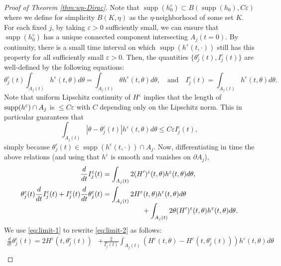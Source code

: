 \documentclass[10pt]{amsart}
\theoremstyle{plain}
\theoremstyle{definition}
\DeclareMathOperator{\supp}{supp}
\let\tht\theta
\let\varep\varepsilon
\begin{document}
\begin{proof}[Proof of Theorem \ref{thm:wp-Dirac}]
Note that $\supp(h_0^{\varep}) \subset B(\supp(h_0), C\varep)$ where we define for simplicity $B(K,\eta)$ as the $\eta$-neighborhood of some set $K$. For each fixed $j$, by taking $\varep>0$ sufficiently small, we can ensure that $\supp(h_0^{\varep})$ has a unique connected component intersecting $A_{j}(t=0)$. By continuity, there is a small time interval on which $\supp(h^\varep(t,\cdot))$ still has this property for all sufficiently small $\varep>0$. Then, the quantities $\{ \tht_{j}^\varep(t), I_{j}^{\varep}(t) \}$ are well-defined by the following equations:\vspace*{-3pt}
\begin{equation*}
\tht_{j}^{\varep}(t) \int_{A_{j}(t)} h^\varep(t,\tht) d\tht = \int_{A_{j}(t)} \tht h^\varep(t,\tht) d\tht, \quad \mbox{and} \quad I_{j}^{\varep}(t) = \int_{A_{j}(t)} h^\varep(t,\tht) d\tht.
\end{equation*}
Note that uniform Lipschitz continuity of $H^\varep$ implies that the length of $\supp(h^\varep)\cap\nobreak A_{j}$ is $\le C\varep$ with $C$ depending only on the Lipschitz norm. This in particular guarantees that\vspace*{-3pt}
\begin{equation*}
\int_{A_j(t)} |\tht - \tht_{j}^{\varep}(t)| h^\varep(t,\tht) d\tht \le C\varep I_{j}^{\varep}(t),
\end{equation*}
simply because $\tht_{j}^{\varep}(t) \in \supp(h^\varep(t,\cdot)) \cap A_{j}$.
Now, differentiating in time the above relations (and using that $h^\varep$ is smooth and vanishes on $\partial A_{j}$),\vspace*{-3pt}
\begin{align}\label{eq:limit-1}
\frac{d}{dt} I_{j}^{\varep}(t) &= \int_{A_{j}(t)} 2 (H')^\varep(t,\tht) h^\varep(t,\tht) d\tht,
\\
\label{eq:limit-2}
\tht_{j}^{\varep}(t)\frac{d}{dt} I_{j}^{\varep}(t) +I_{j}^{\varep}(t) \frac{d}{dt} \tht_{j}^{\varep}(t)&= \int_{A_{j}(t)} 2 H^\varep(t,\tht) h^\varep(t,\tht) d\tht\\[-5pt]
&\hspace*{2cm}+ \int_{A_{j}(t)} 2\tht (H')^\varep(t,\tht) h^\varep(t,\tht) d\tht.\notag
\end{align}
We use \eqref{eq:limit-1} to rewrite \eqref{eq:limit-2} as follows:
\begin{equation*}
\begin{split}
\frac{d}{dt} \tht_{j}^{\varep}(t) = 2H^\varep(t, \tht_{j}^{\varep}(t)) &+ \frac{2}{I_{j}^{\varep}(t) } \int_{A_{j}(t)} (H^\varep(t,\tht) - H^\varep(t,\tht_{j}^{\varep}(t))) h^\varep(t,\tht) d\tht \\

\end{split}
\end{equation*}
\end{proof}
\end{document}
